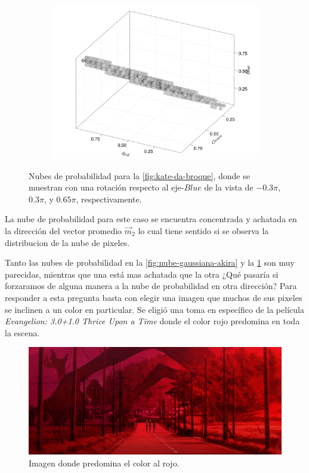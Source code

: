 \begin{figure}[ht!]
\begin{subfigure}[c]{0.3\textwidth}
        \includegraphics[scale=0.09]{../pictures/gaussian_cloud_kate_3}
    \end{subfigure}
    \caption{Nubes de probabilidad para la \cref{fig:kate-da-broque}, donde se muestran con una rotación respecto al eje-$Blue$ de la vista de $-0.3\pi$, $0.3\pi$, y $0.65\pi$, respectivamente.}
    \label{fig:nube-gaussiana-kate}
\end{figure}

La nube de probabilidad para este caso se encuentra concentrada y achatada en la dirección del vector promedio $\vec{m}_2$ lo cual tiene sentido si se observa la distribucion de la nube de pixeles.

Tanto las nubes de probabilidad en la \cref{fig:nube-gaussiana-akira} y la \cref{fig:nube-gaussiana-kate} son muy parecidas, mientras que una está mas achatada que la otra ¿Qué pasaría si forzaramos de alguna manera a la nube de probabilidad en otra dirección? Para responder a esta pregunta basta con elegir una imagen que muchos de sus pixeles se inclinen a un color en particular. Se eligió una toma en específico de la película \textit{Evangelion: 3.0+1.0 Thrice Upon a Time} \cite{hideaki2022eva} donde el color rojo predomina en toda la escena.
\begin{figure}[ht!]
    \centering
    \includegraphics[scale=0.2]{../pictures/evangelion}
    \caption{Imagen donde predomina el color al rojo.}
    \label{fig:evangelion}
\end{figure}

